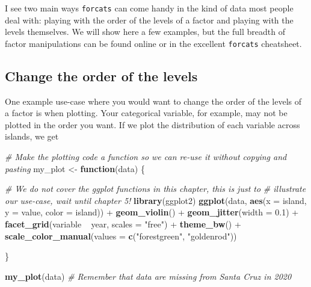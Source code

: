 \documentclass[]{book}
\newenvironment{Shaded}{}{}
\newcommand{\CommentTok}[1]{\textcolor[rgb]{0.38,0.63,0.69}{\textit{#1}}}
\newcommand{\ControlFlowTok}[1]{\textcolor[rgb]{0.00,0.44,0.13}{\textbf{#1}}}
\newcommand{\DataTypeTok}[1]{\textcolor[rgb]{0.56,0.13,0.00}{#1}}
\newcommand{\FloatTok}[1]{\textcolor[rgb]{0.25,0.63,0.44}{#1}}
\newcommand{\KeywordTok}[1]{\textcolor[rgb]{0.00,0.44,0.13}{\textbf{#1}}}
\newcommand{\NormalTok}[1]{#1}
\newcommand{\OperatorTok}[1]{\textcolor[rgb]{0.40,0.40,0.40}{#1}}
\newcommand{\StringTok}[1]{\textcolor[rgb]{0.25,0.44,0.63}{#1}}
\begin{document}
I see two main ways \texttt{forcats} can come handy in the kind of data most people deal with: playing with the order of the levels of a factor and playing with the levels themselves. We will show here a few examples, but the full breadth of factor manipulations can be found online or in the excellent \texttt{forcats} cheatsheet.

\hypertarget{change-the-order-of-the-levels}{%
\subsection{Change the order of the levels}\label{change-the-order-of-the-levels}}

One example use-case where you would want to change the order of the levels of a factor is when plotting. Your categorical variable, for example, may not be plotted in the order you want. If we plot the distribution of each variable across islands, we get

\begin{Shaded}
\begin{Highlighting}[]
\CommentTok{# Make the plotting code a function so we can re-use it without copying and pasting}
\NormalTok{my_plot <-}\StringTok{ }\ControlFlowTok{function}\NormalTok{(data) \{}
  
  \CommentTok{# We do not cover the ggplot functions in this chapter, this is just to}
  \CommentTok{# illustrate our use-case, wait until chapter 5!}
  \KeywordTok{library}\NormalTok{(ggplot2)}
  \KeywordTok{ggplot}\NormalTok{(data, }\KeywordTok{aes}\NormalTok{(}\DataTypeTok{x =}\NormalTok{ island, }\DataTypeTok{y =}\NormalTok{ value, }\DataTypeTok{color =}\NormalTok{ island)) }\OperatorTok{+}\StringTok{ }
\StringTok{    }\KeywordTok{geom_violin}\NormalTok{() }\OperatorTok{+}\StringTok{ }
\StringTok{    }\KeywordTok{geom_jitter}\NormalTok{(}\DataTypeTok{width =} \FloatTok{0.1}\NormalTok{) }\OperatorTok{+}
\StringTok{    }\KeywordTok{facet_grid}\NormalTok{(variable }\OperatorTok{~}\StringTok{ }\NormalTok{year, }\DataTypeTok{scales =} \StringTok{"free"}\NormalTok{) }\OperatorTok{+}
\StringTok{    }\KeywordTok{theme_bw}\NormalTok{() }\OperatorTok{+}
\StringTok{    }\KeywordTok{scale_color_manual}\NormalTok{(}\DataTypeTok{values =} \KeywordTok{c}\NormalTok{(}\StringTok{"forestgreen"}\NormalTok{, }\StringTok{"goldenrod"}\NormalTok{))}
  
\NormalTok{\}}

\KeywordTok{my_plot}\NormalTok{(data)}
\CommentTok{# Remember that data are missing from Santa Cruz in 2020}
\end{Highlighting}
\end{Shaded}
\end{document}
